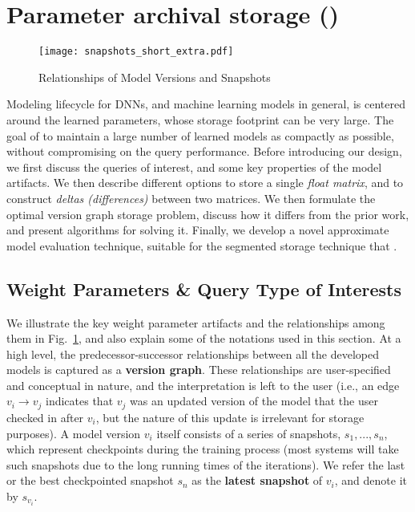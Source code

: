 \documentclass[conference]{IEEEtran}
\begin{document}
\section{Parameter archival storage (\weightstore)}
\label{sec:binary_storage}




\begin{figure}[!t]
\centering
\texttt{[image: snapshots\_short\_extra.pdf]}
\caption{Relationships of Model Versions and Snapshots}
\label{fig:snapshots}
\end{figure}




Modeling lifecycle for DNNs, and machine learning models in general, is centered around the learned parameters, whose storage footprint can be very large. 
The goal of \weightstore\is to maintain a large number of learned models as compactly as possible, without compromising on the query performance.
Before introducing our design, we first discuss the queries of interest, and some key properties of the model artifacts. 
We then describe different options to store a single {\em float matrix}, and to construct {\em deltas (differences)} between two matrices.
We then formulate the optimal version graph storage problem, discuss how it differs from the prior work, and present algorithms for solving it.
Finally, we develop a novel approximate model evaluation technique, suitable for the segmented storage technique that \weightstore\uses.

\subsection{Weight Parameters \& Query Type of Interests}
\label{subsec:pas_query_interests}
We illustrate the key weight parameter artifacts and the relationships among them in Fig.~\ref{fig:snapshots}, and also explain some of the notations
used in this section.
At a high level, the predecessor-successor relationships between all the developed models is captured as a {\bf version graph}. These relationships are user-specified and 
conceptual in nature, and the interpretation is left to the user (i.e., an edge $v_i \rightarrow v_j$ indicates that $v_j$ was an updated version of the model that the user
checked in after $v_i$, but the nature of this update is irrelevant for storage purposes). 
A model version $v_i$ itself consists of a series of snapshots, $s_1, ..., s_n$, which represent checkpoints during the training process (most systems will take such snapshots
due to the long running times of the iterations).
We refer the last or the best checkpointed snapshot $s_n$ as the \textbf{latest snapshot} of $v_i$, and denote it by $s_{v_i}$. 
\end{document}
